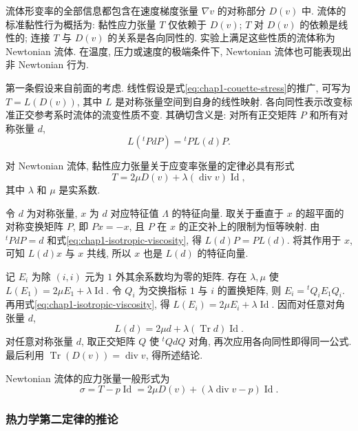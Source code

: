 流体形变率的全部信息都包含在速度梯度张量 $\nabla v$ 的对称部分 $D(v)$ 中. 流体的标准黏性行为概括为: 黏性应力张量 $T$ 仅依赖于 $D(v)$; $T$ 对 $D(v)$ 的依赖是线性的; 连接 $T$ 与 $D(v)$ 的关系是各向同性的. 实验上满足这些性质的流体称为 Newtonian 流体. 在温度, 压力或速度的极端条件下, Newtonian 流体也可能表现出非 Newtonian 行为.

第一条假设来自前面的考虑. 线性假设是式\eqref{eq:chap1-couette-stress}的推广, 可写为 $T=L(D(v))$, 其中 $L$ 是对称张量空间到自身的线性映射. 各向同性表示改变标准正交参考系时流体的流变性质不变. 其确切含义是: 对所有正交矩阵 $P$ 和所有对称张量 $d$,
\begin{equation}
\label{eq:chap1-isotropic-viscosity}
  L({}^t\!P dP)={}^t\!P L(d)P.
\end{equation}

\begin{Proposition}
\label{prop:chap1-newtonian-stress-law}
对 Newtonian 流体, 黏性应力张量关于应变率张量的定律必具有形式
\[
  T=2\mu D(v)+\lambda(\operatorname{div}v)\operatorname{Id},
\]
其中 $\lambda$ 和 $\mu$ 是实系数.
\end{Proposition}

\begin{Proof}
令 $d$ 为对称张量, $x$ 为 $d$ 对应特征值 $\Lambda$ 的特征向量. 取关于垂直于 $x$ 的超平面的对称变换矩阵 $P$, 即 $Px=-x$, 且 $P$ 在 $x$ 的正交补上的限制为恒等映射. 由 ${}^t\!PdP=d$ 和式\eqref{eq:chap1-isotropic-viscosity}, 得 $L(d)P=PL(d)$. 将其作用于 $x$, 可知 $L(d)x$ 与 $x$ 共线, 所以 $x$ 也是 $L(d)$ 的特征向量.

记 $E_i$ 为除 $(i,i)$ 元为 $1$ 外其余系数均为零的矩阵. 存在 $\lambda,\mu$ 使 $L(E_1)=2\mu E_1+\lambda\operatorname{Id}$. 令 $Q_i$ 为交换指标 $1$ 与 $i$ 的置换矩阵, 则 $E_i={}^t\!Q_iE_1Q_i$. 再用式\eqref{eq:chap1-isotropic-viscosity}, 得 $L(E_i)=2\mu E_i+\lambda\operatorname{Id}$. 因而对任意对角张量 $d$,
\[
  L(d)=2\mu d+\lambda(\operatorname{Tr}d)\operatorname{Id}.
\]
对任意对称张量 $d$, 取正交矩阵 $Q$ 使 ${}^t\!QdQ$ 对角, 再次应用各向同性即得同一公式. 最后利用 $\operatorname{Tr}(D(v))=\operatorname{div}v$, 得所述结论.
\end{Proof}

Newtonian 流体的应力张量一般形式为
\[
  \sigma=T-p\operatorname{Id}=2\mu D(v)+(\lambda\operatorname{div}v-p)\operatorname{Id}.
\]

\subsubsection{热力学第二定律的推论}
\label{subsec:chap1-second-law}

